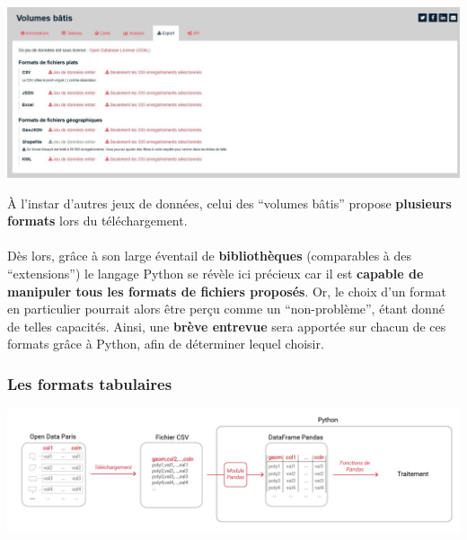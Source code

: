 \documentclass[
  11pt,
  french,
]{article}
\newcounter{customfigs}[section]
\newenvironment{customfigs}[1][] {
    \stepcounter{customfigs}
    Fig \arabic{section}. \arabic{customfigs} : }
\newcommand{\masked}{\vspace*{-\baselineskip}}
\begin{document}
\begin{tcolorbox}[title=\begin{customfigs} Un choix étendu de formats de fichiers \end{customfigs}]

\begin{center}\includegraphics[width=1\linewidth]{__imgs/site_odp_formats} \end{center}

\end{tcolorbox}

À l'instar d'autres jeux de données, celui des ``volumes bâtis'' propose
\textbf{plusieurs formats} lors du téléchargement.\\
~\\
Dès lors, grâce à son large éventail de \textbf{bibliothèques}
(comparables à des ``extensions'') le langage Python se révèle ici
précieux car il est \textbf{capable de manipuler tous les formats de
fichiers proposés}. Or, le choix d'un format en particulier pourrait
alors être perçu comme un ``non-problème'', étant donné de telles
capacités. Ainsi, une \textbf{brève entrevue} sera apportée sur chacun
de ces formats grâce à Python, afin de déterminer lequel choisir.\\

\newpage

\hypertarget{les-formats-tabulaires}{%
\subsubsection{Les formats tabulaires}\label{les-formats-tabulaires}}

\begin{tcolorbox}[title=\begin{customfigs} Chargement du jeu de données sous un format tabulaire dans Python \end{customfigs}]

\begin{center}\includegraphics[width=1\linewidth]{__imgs/io_csv} \end{center}

\end{tcolorbox}
\end{document}
